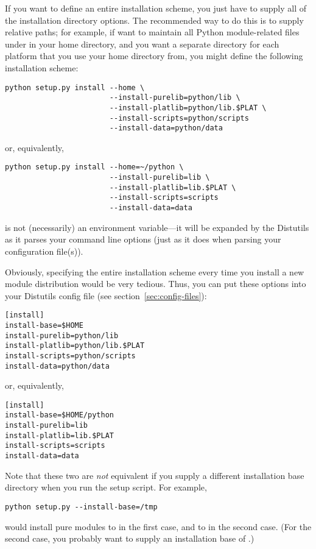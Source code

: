 \documentclass{howto}
\newcommand{\filevar}[1]{{\textsl{\filenq{#1}}}}
\begin{document}
If you want to define an entire installation scheme, you just have to
supply all of the installation directory options.  The recommended way
to do this is to supply relative paths; for example, if want to maintain
all Python module-related files under  in your home
directory, and you want a separate directory for each platform that you
use your home directory from, you might define the following
installation scheme:
\begin{verbatim}
python setup.py install --home \
                        --install-purelib=python/lib \
                        --install-platlib=python/lib.$PLAT \
                        --install-scripts=python/scripts
                        --install-data=python/data
\end{verbatim}
or, equivalently,
\begin{verbatim}
python setup.py install --home=~/python \
                        --install-purelib=lib \
                        --install-platlib=lib.$PLAT \
                        --install-scripts=scripts
                        --install-data=data
\end{verbatim}
\code{\$PLAT} is not (necessarily) an environment variable---it will be
expanded by the Distutils as it parses your command line options (just
as it does when parsing your configuration file(s)).

Obviously, specifying the entire installation scheme every time you
install a new module distribution would be very tedious.  Thus, you can
put these options into your Distutils config file (see
section~\ref{sec:config-files}):
\begin{verbatim}
[install]
install-base=$HOME
install-purelib=python/lib
install-platlib=python/lib.$PLAT
install-scripts=python/scripts
install-data=python/data
\end{verbatim}
or, equivalently,
\begin{verbatim}
[install]
install-base=$HOME/python
install-purelib=lib
install-platlib=lib.$PLAT
install-scripts=scripts
install-data=data
\end{verbatim}
Note that these two are \emph{not} equivalent if you supply a different
installation base directory when you run the setup script.  For example,
\begin{verbatim}
python setup.py --install-base=/tmp
\end{verbatim}
would install pure modules to \filevar{/tmp/python/lib} in the first
case, and to \filevar{/tmp/lib} in the second case.  (For the second
case, you probably want to supply an installation base of
.)
\end{document}
